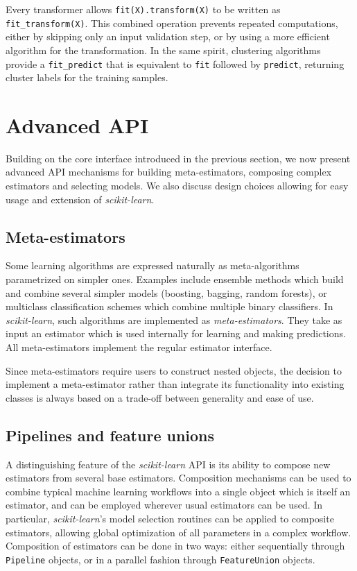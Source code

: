\documentclass[twocolumn]{article}
\newcommand{\sklearn}{\textit{scikit-learn}\xspace}
\begin{document}
Every transformer allows \texttt{fit(X).transform(X)}
to be written as \texttt{fit\_transform(X)}.
This combined operation prevents repeated computations,
either by skipping only an input validation step,
or by using a more efficient algorithm for the transformation.
In the same spirit, clustering algorithms provide a \texttt{fit\_predict}
that is equivalent to \texttt{fit} followed by \texttt{predict},
returning cluster labels for the training samples.


\section{Advanced API}

\label{sec:advanced-api}

Building on the core interface introduced in the previous section, we now
present advanced API mechanisms for building meta-estimators,
composing complex estimators and selecting models. We also discuss design
choices allowing for easy usage and extension of \sklearn.

\subsection{Meta-estimators}

Some learning algorithms are expressed naturally
as meta-algorithms parametrized on simpler ones.
Examples include ensemble methods which
build and combine several simpler models (boosting, bagging, random forests),
or multiclass classification schemes which combine multiple binary classifiers.
In \sklearn, such algorithms are implemented as \textit{meta-estimators}.
They take as input an estimator which is used
internally for learning and making predictions.
All meta-estimators implement the regular estimator interface.

Since meta-estimators require users to construct nested objects,
the decision to implement a meta-estimator
rather than integrate its functionality
into existing classes
is always based on a trade-off between generality and ease of use.

\subsection{Pipelines and feature unions}

A distinguishing feature of the \sklearn API is its ability to
compose new estimators from several base estimators. Composition mechanisms can
be used to combine typical machine learning workflows into a single object which
is itself an estimator, and can be employed wherever usual estimators can be used.
In particular, \sklearn's model selection routines
can be applied to composite estimators, allowing global optimization
of all parameters in a complex workflow.
Composition of estimators can be done in two
ways: either sequentially through \texttt{Pipeline} objects, or in a parallel
fashion through \texttt{FeatureUnion} objects.
\end{document}
